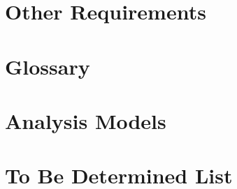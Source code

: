 \chapter{Other Requirements}
\label{Other Requirements}

\begin{appendices}
\chapter{Glossary}
\chapter{Analysis Models}
\chapter{To Be Determined List}


\end{appendices}


